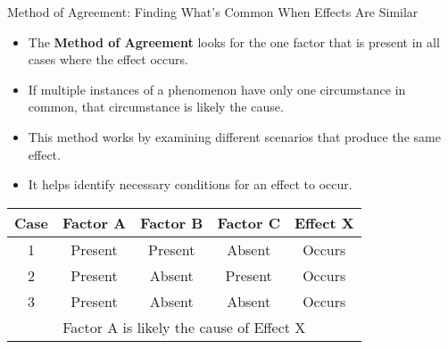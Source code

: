 \documentclass{beamer}
\begin{document}
\begin{frame}{Method of Agreement: Finding What's Common When Effects Are Similar}
    \begin{itemize}
        \item The \textbf{Method of Agreement} looks for the one factor that is present in all cases where the effect occurs.
        \item If multiple instances of a phenomenon have only one circumstance in common, that circumstance is likely the cause.
        \item This method works by examining different scenarios that produce the same effect.
        \item It helps identify necessary conditions for an effect to occur.
    \end{itemize}
    
    \begin{table}
        \centering
        \begin{tabular}{|c|c|c|c|c|}
            \hline
            \textbf{Case} & \textbf{Factor A} & \textbf{Factor B} & \textbf{Factor C} & \textbf{Effect X} \\
            \hline
            1 & Present & Present & Absent & Occurs \\
            2 & Present & Absent & Present & Occurs \\
            3 & Present & Absent & Absent & Occurs \\
            \hline
            \multicolumn{5}{|c|}{Factor A is likely the cause of Effect X} \\
            \hline
        \end{tabular}
    \end{table}
\end{frame}
\end{document}
